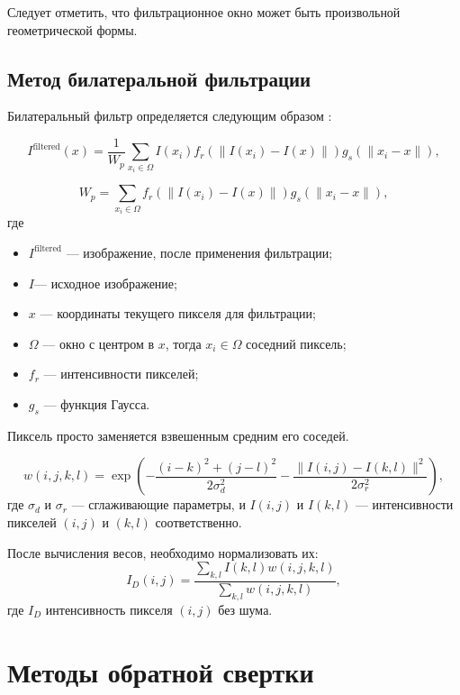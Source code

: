 Следует отметить, что фильтрационное окно может быть произвольной геометрической формы.


\subsection{Метод билатеральной фильтрации}

Билатеральный фильтр определяется следующим образом \cite{bilateralfilter}:

\begin{equation}
	I^\text{filtered}(x) = \frac{1}{W_p} \sum_{x_i \in \Omega} I(x_i)f_r(\|I(x_i) - I(x)\|)g_s(\|x_i - x\|),
\end{equation}

\begin{equation}
	W_p = \sum_{x_i \in \Omega}{f_r(\|I(x_i) - I(x)\|)g_s(\|x_i - x\|)},
\end{equation}
где
\begin{itemize}
	\item $I^\text{filtered}$ ---  изображение, после применения фильтрации;
	\item $I$---  исходное изображение;
	\item $x$ ---  координаты текущего пикселя для фильтрации;
	\item $\Omega$ ---  окно с центром в $x$, тогда $x_i \in \Omega$ соседний пиксель;
	\item $f_r$ ---  интенсивности пикселей;
	\item $g_s$ --- функция Гаусса.
\end{itemize}

Пиксель просто заменяется взвешенным средним его соседей.

\begin{equation}
	w(i, j, k, l) = \exp\left(-\frac{(i - k)^2 + (j - l)^2}{2 \sigma_d^2} - \frac{\|I(i, j) - I(k, l)\|^2}{2 \sigma_r^2}\right),
\end{equation}
где $\sigma_d$ и $\sigma_r$ --- сглаживающие параметры, и $I(i, j)$ и $I(k, l)$ --- интенсивности пикселей $(i, j)$ и $ (k, l)$ соответственно.

После вычисления весов, необходимо нормализовать их:
\begin{equation}
	I_D(i, j) = \frac{\sum_{k, l} I(k, l) w(i, j, k, l)}{\sum_{k, l} w(i, j, k, l)},
\end{equation}
где $I_D$ интенсивность пикселя $(i, j)$ без шума.

\section{Методы обратной свертки}

